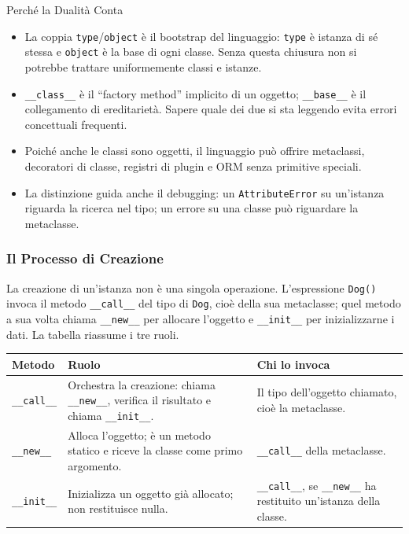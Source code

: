 \documentclass[12pt]{extarticle}
\begin{document}
\begin{cbox}{Perché la Dualità Conta}
\begin{itemize}
    \item La coppia \texttt{type}/\texttt{object} è il bootstrap del linguaggio: \texttt{type} è istanza di sé stessa e \texttt{object} è la base di ogni classe. Senza questa chiusura non si potrebbe trattare uniformemente classi e istanze.
    \item \texttt{\_\_class\_\_} è il ``factory method'' implicito di un oggetto; \texttt{\_\_base\_\_} è il collegamento di ereditarietà. Sapere quale dei due si sta leggendo evita errori concettuali frequenti.
    \item Poiché anche le classi sono oggetti, il linguaggio può offrire metaclassi, decoratori di classe, registri di plugin e ORM senza primitive speciali.
    \item La distinzione guida anche il debugging: un \texttt{AttributeError} su un'istanza riguarda la ricerca nel tipo; un errore su una classe può riguardare la metaclasse.
\end{itemize}
\end{cbox}

\subsubsection{Il Processo di Creazione}

\noindent La creazione di un'istanza non è una singola operazione. L'espressione \texttt{Dog()} invoca il metodo \texttt{\_\_call\_\_} del tipo di \texttt{Dog}, cioè della sua metaclasse; quel metodo a sua volta chiama \texttt{\_\_new\_\_} per allocare l'oggetto e \texttt{\_\_init\_\_} per inizializzarne i dati. La tabella riassume i tre ruoli.

\begin{center}
\small
\begin{tabular}{p{3.0cm}p{5.2cm}p{6.2cm}}
    \toprule
    \textbf{Metodo} & \textbf{Ruolo} & \textbf{Chi lo invoca} \\
    \midrule
    \texttt{\_\_call\_\_} & Orchestra la creazione: chiama \texttt{\_\_new\_\_}, verifica il risultato e chiama \texttt{\_\_init\_\_}. & Il tipo dell'oggetto chiamato, cioè la metaclasse. \\
    \addlinespace
    \texttt{\_\_new\_\_} & Alloca l'oggetto; è un metodo statico e riceve la classe come primo argomento. & \texttt{\_\_call\_\_} della metaclasse. \\
    \addlinespace
    \texttt{\_\_init\_\_} & Inizializza un oggetto già allocato; non restituisce nulla. & \texttt{\_\_call\_\_}, se \texttt{\_\_new\_\_} ha restituito un'istanza della classe. \\
    \bottomrule
\end{tabular}
\end{center}
\end{document}
